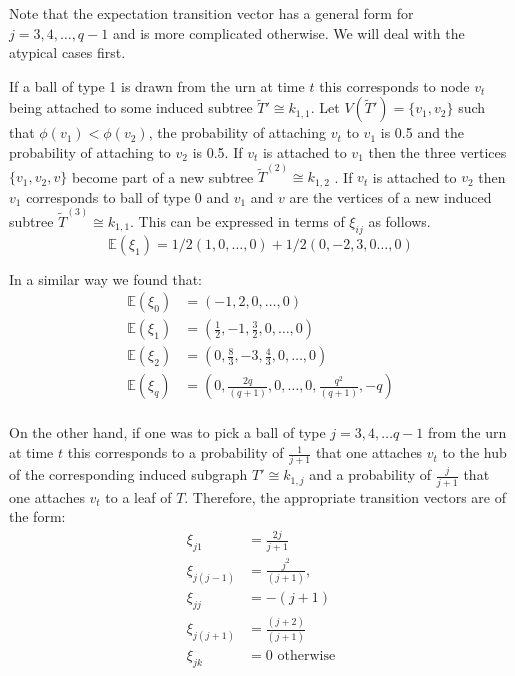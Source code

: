 \documentclass[12pt]{article} %
\theoremstyle{definition}
\begin{document}
 
Note that the expectation transition vector has a general form for $j = 3,4,\dots,q-1$ and is more complicated otherwise. We will deal with the atypical cases first.  

If a ball of type 1 is drawn from the urn at time $t$ this corresponds to node $v_{t}$ being attached to some induced subtree $\tilde{T}' \cong k_{1,1}$.  Let $V(\tilde{T}') = \{v_{1},v_{2}\}$ such that $\phi(v_{1}) < \phi(v_{2})$, the probability of attaching $v_{t}$ to $v_{1}$ is 0.5 and the probability of attaching to $v_{2}$ is 0.5.  If $v_{t}$ is attached to $v_{1}$ then the three vertices $\{v_{1},v_{2},v\}$ become part of a new subtree $\tilde{T}^{(2)} \cong k_{1,2}$ .  If $v_{t}$ is attached to $v_{2}$ then $v_{1}$ corresponds to ball of type 0 and $v_{1}$ and $v$ are the vertices of a new induced subtree $\tilde{T}^{(3)}\cong k_{1,1}$.  This can be expressed in terms of $\xi_{ij}$ as follows.
 \[
   \mathbb{E}(\xi_{1}) = 1/2(1,0,\dots,0) + 1/2(0,-2,3,0 \dots, 0) 
 \]
 
 
In a similar way we found that:
 \begin{align}
  \mathbb{E}(\xi_{0}) &= (-1,2,0,\dots,0)\\
   \mathbb{E}(\xi_{1}) &= (\frac{1}{2}, -1, \frac{3}{2},0,\dots,0)\\
  \mathbb{E}(\xi_{2}) &= (0,\frac{8}{3}, -3,\frac{4}{3},0,\dots,0)\\
  \mathbb{E}(\xi_{q}) &= (0,\frac{2q}{(q+1)},0,\dots,0,\frac{q^{2}}{(q+1)}, -q)\\
 \end{align}
 
On the other hand, if one was to pick a ball of type $j = 3,4,\dots q-1$ from the urn at time $t$ this corresponds to a probability of $\frac{1}{j+1}$ that one attaches $v_{t}$ to the hub of the corresponding induced subgraph $ T' \cong k_{1,j}$ and a probability of $\frac{j}{j+1}$ that one attaches $v_{t}$ to a leaf of $T$.  Therefore, the appropriate transition vectors are of the form:
\begin{align}
 \xi_{j1} &= \frac{2j}{j+1}\\
 \xi_{j(j-1)} &= \frac{j^{2}}{(j+1)},\\ 
 \xi_{jj} &= -(j+1)\\
 \xi_{j(j+1)} &= \frac{(j+2)}{(j+1)}\\
 \xi_{jk} &= 0 \text{   otherwise} \\
\end{align}
\end{document}
